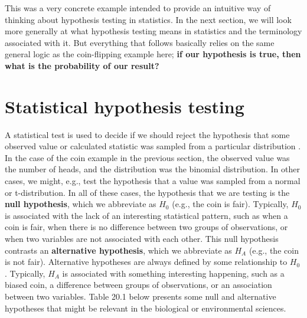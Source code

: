 \documentclass[
]{scrbook}
\begin{document}
This was a very concrete example intended to provide an intuitive way of thinking about hypothesis testing in statistics.
In the next section, we will look more generally at what hypothesis testing means in statistics and the terminology associated with it.
But everything that follows basically relies on the same general logic as the coin-flipping example here; \textbf{if our hypothesis is true, then what is the probability of our result?}

\hypertarget{statistical-hypothesis-testing}{%
\section{Statistical hypothesis testing}\label{statistical-hypothesis-testing}}

A statistical test is used to decide if we should reject the hypothesis that some observed value or calculated statistic was sampled from a particular distribution \citep{Sokal1995}.
In the case of the coin example in the previous section, the observed value was the number of heads, and the distribution was the binomial distribution.
In other cases, we might, e.g., test the hypothesis that a value was sampled from a normal or t-distribution.
In all of these cases, the hypothesis that we are testing is the \textbf{null hypothesis}, which we abbreviate as \(H_{0}\) (e.g., the coin is fair).
Typically, \(H_{0}\) is associated with the lack of an interesting statistical pattern, such as when a coin is fair, when there is no difference between two groups of observations, or when two variables are not associated with each other.
This null hypothesis contrasts an \textbf{alternative hypothesis}, which we abbreviate as \(H_{A}\) (e.g., the coin is not fair).
Alternative hypotheses are always defined by some relationship to \(H_{0}\) \citep{Sokal1995}.
Typically, \(H_{A}\) is associated with something interesting happening, such as a biased coin, a difference between groups of observations, or an association between two variables.
Table 20.1 below presents some null and alternative hypotheses that might be relevant in the biological or environmental sciences.
\end{document}
